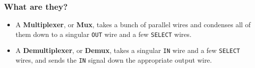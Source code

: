 \documentclass{beamer}
\begin{document}
    	\begin{frame}
    		\frametitle{What are they?}
    		\begin{itemize}
    			\item A \textbf{Multiplexer}, or \textbf{Mux}, takes a bunch of parallel wires and condenses all of them down to a singular \texttt{OUT} wire and a few \texttt{SELECT} wires.
    			\item A \textbf{Demultiplexer}, or \textbf{Demux}, takes a singular \texttt{IN} wire and a few \texttt{SELECT} wires, and sends the \texttt{IN} signal down the appropriate output wire.
    		\end{itemize}
    		
    		
			


\begin{tikzpicture}[x=0.75pt,y=0.75pt,yscale=-1,xscale=1]


\end{tikzpicture}
\end{frame}
\end{document}
